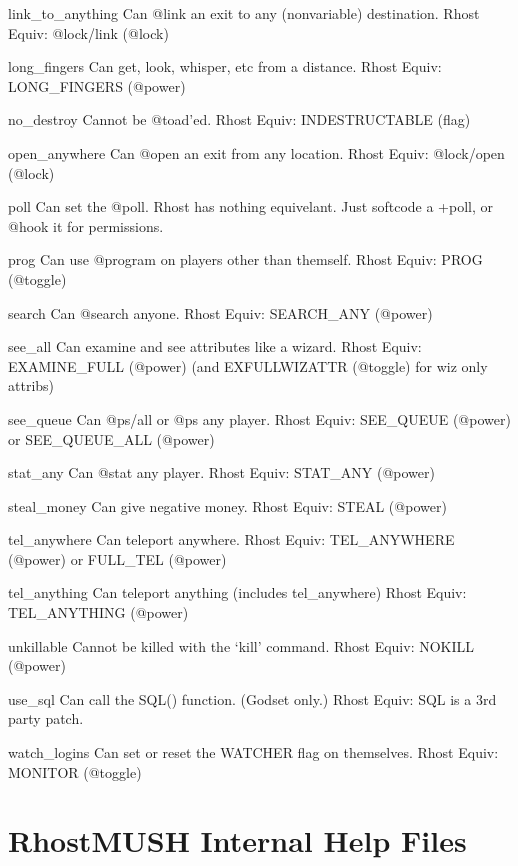 \documentclass[letterpaper,10pt,english]{sphinxmanual}
\begin{document}
\sphinxAtStartPar
link\_to\_anything      Can @link an exit to any (non\sphinxhyphen{}variable) destination.
Rhost Equiv: @lock/link (@lock)

\sphinxAtStartPar
long\_fingers          Can get, look, whisper, etc from a distance.
Rhost Equiv: LONG\_FINGERS (@power)

\sphinxAtStartPar
no\_destroy            Cannot be @toad’ed.
Rhost Equiv: INDESTRUCTABLE (flag)

\sphinxAtStartPar
open\_anywhere         Can @open an exit from any location.
Rhost Equiv: @lock/open (@lock)

\sphinxAtStartPar
poll                  Can set the @poll.
Rhost has nothing equivelant.  Just softcode a +poll, or @hook it for permissions.

\sphinxAtStartPar
prog                  Can use @program on players other than themself.
Rhost Equiv: PROG (@toggle)

\sphinxAtStartPar
search                Can @search anyone.
Rhost Equiv: SEARCH\_ANY (@power)

\sphinxAtStartPar
see\_all               Can examine and see attributes like a wizard.
Rhost Equiv: EXAMINE\_FULL (@power) (and EXFULLWIZATTR (@toggle) for wiz only attribs)

\sphinxAtStartPar
see\_queue             Can @ps/all or @ps any player.
Rhost Equiv: SEE\_QUEUE (@power) or SEE\_QUEUE\_ALL (@power)

\sphinxAtStartPar
stat\_any              Can @stat any player.
Rhost Equiv: STAT\_ANY (@power)

\sphinxAtStartPar
steal\_money           Can give negative money.
Rhost Equiv: STEAL (@power)

\sphinxAtStartPar
tel\_anywhere          Can teleport anywhere.
Rhost Equiv: TEL\_ANYWHERE (@power) or FULL\_TEL (@power)

\sphinxAtStartPar
tel\_anything          Can teleport anything (includes tel\_anywhere)
Rhost Equiv: TEL\_ANYTHING (@power)

\sphinxAtStartPar
unkillable            Cannot be killed with the ‘kill’ command.
Rhost Equiv: NOKILL (@power)

\sphinxAtStartPar
use\_sql               Can call the SQL() function. (God\sphinxhyphen{}set only.)
Rhost Equiv: SQL is a 3rd party patch.

\sphinxAtStartPar
watch\_logins          Can set or reset the WATCHER flag on themselves.
Rhost Equiv: MONITOR (@toggle)


\chapter{RhostMUSH Internal Help Files}
\label{\detokenize{helpfile:rhostmush-internal-help-files}}\label{\detokenize{helpfile::doc}}
\end{document}
